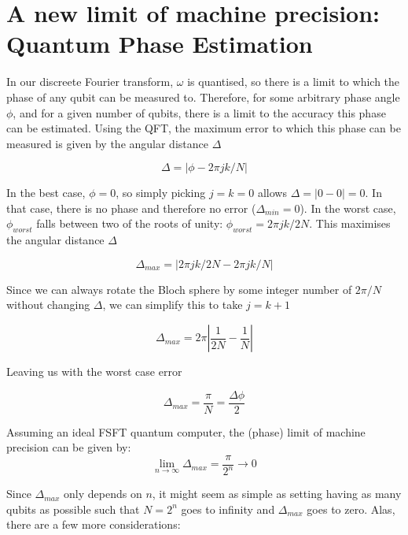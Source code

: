 \section{A new limit of machine precision: Quantum Phase Estimation}

In our discreete Fourier transform, $\omega$ is quantised, so there is a limit to which the phase of any qubit can be measured to. Therefore, for some arbitrary phase angle $\phi$, and for a given number of qubits, there is a limit to the accuracy this phase can be estimated. Using the QFT, the maximum error to which this phase can be measured is given by the angular distance $\Delta$

$$ \Delta = | \phi - 2\pi jk/N | $$

In the best case, $\phi = 0 $, so simply picking $ j = k = 0 $ allows $\Delta = | 0 - 0 | = 0 $. In that case, there is no phase and therefore no error ($\Delta_{min} = 0$). In the worst case, $\phi_{worst}$ falls between two of the roots of unity: $\phi_{worst} = 2\pi jk/2N$. This maximises the angular distance $\Delta$

$$ \Delta_{max} = | 2\pi jk/2N - 2\pi jk/N | $$

Since we can always rotate the Bloch sphere by some integer number of $ 2\pi/N $ without changing $ \Delta $, we can simplify this to take $j = k + 1$

$$ \Delta_{max} = 2\pi \left| \frac{1}{2N} - \frac{1}{N} \right| $$

Leaving us with the worst case error 

$$ \Delta_{max} = \frac{\pi}{N} = \frac{\Delta\phi}{2} $$

Assuming an ideal FSFT quantum computer, the (phase) limit of machine precision can be given by:
$$
\lim_{n \rightarrow \infty} \Delta_{max} = \frac{\pi}{2^n} \rightarrow 0
$$

Since $\Delta_{max}$ only depends on $n$, it might seem as simple as setting having as many qubits as possible such that $N = 2^n$ goes to infinity and $\Delta_{max}$ goes to zero. Alas, there are a few more considerations:

